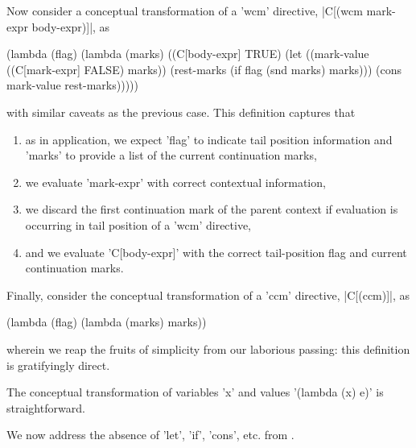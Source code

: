 Now consider a conceptual transformation of a \scheme'wcm' directive, \scheme|C[(wcm mark-expr body-expr)]|, as
\begin{schemeblock}
\begin{schemedisplay}
(lambda (flag)
  (lambda (marks)
    ((C[body-expr] TRUE) (let ((mark-value ((C[mark-expr] FALSE) marks))
                               (rest-marks (if flag (snd marks) marks)))
                           (cons mark-value rest-marks)))))
\end{schemedisplay}
\end{schemeblock}
with similar caveats as the previous case. This definition captures that
\begin{enumerate}
\item as in application, we expect \scheme'flag' to indicate tail position information and \scheme'marks' to provide a list of the current continuation marks,
\item we evaluate \scheme'mark-expr' with correct contextual information,
\item we discard the first continuation mark of the parent context if evaluation is occurring in tail position of a \scheme'wcm' directive,
\item and we evaluate \scheme'C[body-expr]' with the correct tail-position flag and current continuation marks.
\end{enumerate}

Finally, consider the conceptual transformation of a \scheme'ccm' directive, \scheme|C[(ccm)]|, as
\begin{schemeblock}
\begin{schemedisplay}
(lambda (flag)
  (lambda (marks)
    marks))
\end{schemedisplay}
\end{schemeblock}
wherein we reap the fruits of simplicity from our laborious passing: this definition is gratifyingly direct.

The conceptual transformation of variables \scheme'x' and values \scheme'(lambda (x) e)' is straightforward.

We now address the absence of \scheme'let', \scheme'if', \scheme'cons', etc. from \lv.

